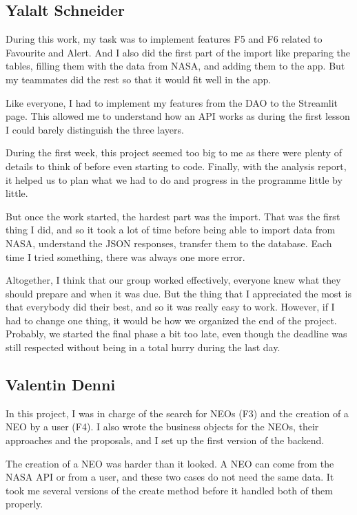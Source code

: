 \subsection{Yalalt Schneider}

During this work, my task was to implement features F5 and F6 related to Favourite and Alert. And I also did the first part of the import like preparing the tables, filling them with the data from NASA, and adding them to the app. But my teammates did the rest so that it would fit well in the app. 

Like everyone, I had to implement my features from the DAO to the Streamlit page. This allowed me to understand how an API works as during the first lesson I could barely distinguish the three layers. 

During the first week, this project seemed too big to me as there were plenty of details to think of before even starting to code. Finally, with the analysis report, it helped us to plan what we had to do and progress in the programme little by little.

But once the work started, the hardest part was the import. That was the first thing I did, and so it took a lot of time before being able to import data from NASA, understand the JSON responses, transfer them to the database. Each time I tried something, there was always one more error.

\bigskip

Altogether, I think that our group worked effectively, everyone knew what they should prepare and when it was due. But the thing that I appreciated the most is that everybody did their best, and so it was really easy to work. However, if I had to change one thing, it would be how we organized the end of the project. Probably, we started the final phase a bit too late, even though the deadline was still respected without being in a total hurry during the last day.

\subsection{Valentin Denni}


In this project, I was in charge of the search for NEOs (F3) and the creation of a NEO by a user
(F4). I also wrote the business objects for the NEOs, their approaches and the proposals, and I
set up the first version of the backend.

The creation of a NEO was harder than it looked. A NEO can come from the NASA API or from a user,
and these two cases do not need the same data. It took me several versions of the create method
before it handled both of them properly.

